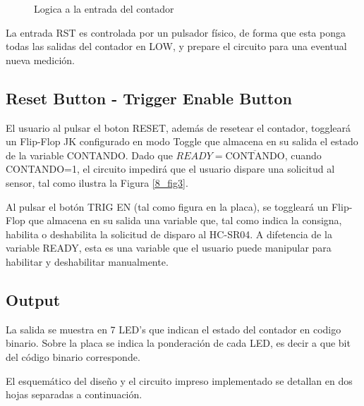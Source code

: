 \begin{figure}[H]
\centering

\caption{Logica a la entrada del contador} \label{8_fig6}
\end{figure}

La entrada RST es controlada por un pulsador físico, de forma que esta ponga todas las salidas del contador en LOW, y prepare el circuito para una eventual nueva medición.

\subsection*{Reset Button - Trigger Enable Button}

El usuario al pulsar el boton RESET, además de resetear el contador, toggleará un Flip-Flop JK configurado en modo Toggle que almacena en su salida el estado de la variable CONTANDO. Dado que $READY=\overline{\text{CONTANDO}}$, cuando CONTANDO=1, el circuito impedirá que el usuario dispare una solicitud al sensor, tal como ilustra la Figura \ref{8_fig3}.

Al pulsar el botón TRIG EN (tal como figura en la placa), se toggleará un Flip-Flop que almacena en su salida una variable que, tal como indica la consigna,  habilita o deshabilita la solicitud de disparo al HC-SR04. A difetencia de la variable READY, esta es una variable que el usuario puede manipular para habilitar y deshabilitar manualmente.

\subsection*{Output}

La salida se muestra en 7 LED's que indican el estado del contador en codigo binario. Sobre la placa se indica la ponderación de cada LED, es decir a que bit del código binario corresponde. 

\bigskip
\bigskip

El esquemático del diseño y el circuito impreso implementado se detallan en dos hojas separadas a continuación.




